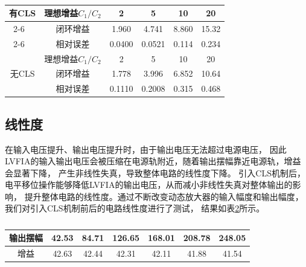 \begin{table}[htbp]
    \centering
    \caption{}
    \label{tab:CLS电路闭环增益}
    \begin{tabular}{|c|c|c|c|c|c|}
        \hline
        \multirow{3}{*}{有CLS} & 理想增益${C_1/C_2}$& 2 & 5 & 10 & 20 \\
        \cline{2-6}
         ~ & 闭环增益 & 1.960 & 4.741 & 8.860 & 15.32  \\
        \cline{2-6}
         ~ & 相对误差 & 0.0400 & 0.0521  & 0.114 & 0.234  \\
        \hline
        \multirow{3}{*}{无CLS} & 理想增益${C_1/C_2}$& 2 & 5 & 10 & 20 \\
        \cline{2-6}
         ~ & 闭环增益 & 1.778 & 3.996 & 6.852 & 10.64  \\
        \cline{2-6}
         ~ & 相对误差 & 0.1110 & 0.2008  & 0.315 & 0.468  \\
         \hline
    \end{tabular}
\end{table}


\subsection{线性度}
在输入电压提升、输出电压提升时，由于输出电压无法超过电源电压，
因此LVFIA的输入输出电压会被压缩在电源轨附近，随着输出摆幅靠近电源轨，增益会显著下降，
产生非线性失真，导致整体电路的线性度下降。
引入CLS机制后，电平移位操作能够降低LVFIA的输出电压，从而减小非线性失真对整体输出的影响，
提升整体电路的线性度。通过不断改变动态放大器的输入幅度和输出幅度，我们对引入CLS机制前后的电路线性度进行了测试，
结果如表\ref{tab:CLS电路线性度测试}所示。



\begin{table}[htbp]
    \centering
    \caption{}
    \label{tab:CLS电路线性度测试}
    \begin{tabular}{|c|c|c|c|c|c|c|}
        \hline
         输出摆幅 & 42.53 & 84.71 & 126.65 & 168.01 & 208.78 & 248.05 \\
        \hline
        增益 & 42.63 & 42.44 & 42.31 & 42.11 & 41.88 & 41.54 \\
        \hline
    \end{tabular}
\end{table}
